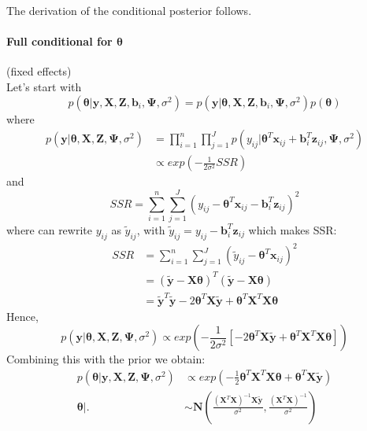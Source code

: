 \documentclass[a4paper]{article}
\begin{document}
The derivation of the conditional posterior follows.

\paragraph{Full conditional for $\bm{\theta}$}(fixed effects) \\

Let's start with
 \begin{equation*}
	p(\bm{\theta}|\bm{y}, \bm{X}, \bm{Z}, \bm{b}_{i}, \bm{\Psi}, \sigma^2) = 	p(\bm{y}|\bm{\theta}, \bm{X}, \bm{Z}, \bm{b}_{i}, \bm{\Psi}, \sigma^2) p(\bm{\theta})
 \end{equation*}
where
 \begin{equation*}
  \begin{split}
  p(\bm{y}|\bm{\theta},\bm{X},\bm{Z},\bm{\Psi},\sigma^2) &= \prod_{i=1}^n \prod_{j=1}^Jp(y_{ij}|\bm{\theta}^{T}\bm{x}_{ij} + \bm{b}_{i}^{T}\bm{z}_{ij}, \bm{\Psi}, \sigma^2) \\
  &\propto exp(-\frac{1}{2\sigma^2}SSR)
  \end{split}
 \end{equation*}
and
 \begin{equation*}
  SSR = \sum_{i = 1}^{n}\sum_{j = 1}^{J}( y_{ij}-\bm{\theta}^{T}\bm{x}_{ij} - \bm{b}_{i}^{T}\bm{z}_{ij})^2
 \end{equation*}
where can rewrite $y_{ij}$ as $\tilde{y}_{ij}$, with $\tilde{y}_{ij} = y_{ij} - \bm{b}^{T}_{i}\bm{z}_{ij}$ which makes SSR:
 \begin{equation*}
  \begin{split}
   SSR& = \sum_{i = 1}^{n}\sum_{j = 1}^{J}( \tilde{y}_{ij}-\bm{\theta}^{T}\bm{x}_{ij})^2\\
   &= ( \tilde{\bm{y}} - \bm{X}\bm{\theta} )^{T}( \tilde{\bm{y}} - \bm{X}\bm{\theta} )\\
   &= \tilde{\bm{y}}^{T}\tilde{\bm{y}} - 2\bm{\theta}^{T}\bm{X}\tilde{\bm{y}} + \bm{\theta}^{T}\bm{X}^{T}\bm{X}\bm{\theta}
  \end{split}
 \end{equation*}
Hence,
 \begin{equation*}
	p(\bm{y}|\bm{\theta}, \bm{X}, \bm{Z}, \bm{\Psi}, \sigma^2) \propto exp(-\frac{1}{2\sigma^2}[- 2\bm{\theta}^{T}\bm{X}\tilde{\bm{y}} + \bm{\theta}^{T}\bm{X}^{T}\bm{X}\bm{\theta}])
 \end{equation*}
Combining this with the prior we obtain:
 \begin{equation}
  \begin{split}
	p(\bm{\theta}|\bm{y}, \bm{X}, \bm{Z}, \bm{\Psi}, \sigma^2)& \propto exp(-\frac{1}{2}\bm{\theta}^{T}\bm{X}^{T}\bm{X}\bm{\theta} + \bm{\theta}^{T}\bm{X}\tilde{\bm{y}}) \\
	\bm{\theta}|.&\sim \bm{N}\left(\frac{(\bm{X}^{T}\bm{X})^{-1}\bm{X}\bm{\tilde{y}}}{\sigma^2}, \frac{(\bm{X}^{T}\bm{X})^{-1}}{\sigma^2}\right)
  \end{split}
 \end{equation}
\end{document}
